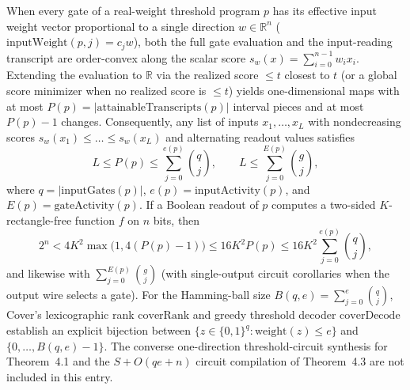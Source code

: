 \begin{result}
When every gate of a real-weight threshold program $p$ has its effective input
weight vector proportional to a single direction $w\in\mathbb R^n$
($\mathrm{inputWeight}(p,j)=c_j w$), both the full gate evaluation and the
input-reading transcript are order-convex along the scalar score
$s_w(x)=\sum_{i=0}^{n-1}w_i x_i$. Extending the evaluation to $\mathbb R$ via
the realized score $\le t$ closest to $t$ (or a global score minimizer when no
realized score is $\le t$) yields one-dimensional maps with at most
$P(p)=|\mathrm{attainableTranscripts}(p)|$ interval pieces and at most $P(p)-1$
changes. Consequently, any list of inputs $x_1,\dots,x_L$ with nondecreasing
scores $s_w(x_1)\le\dots\le s_w(x_L)$ and alternating readout values satisfies
\[
L \le P(p) \le \sum_{j=0}^{e(p)}\binom{q}{j},\qquad
L \le \sum_{j=0}^{E(p)}\binom{g}{j},
\]
where $q=|\mathrm{inputGates}(p)|$, $e(p)=\mathrm{inputActivity}(p)$, and
$E(p)=\mathrm{gateActivity}(p)$. If a Boolean readout of $p$ computes a
two-sided $K$-rectangle-free function $f$ on $n$ bits, then
\[
2^n < 4K^2\max\!\big(1,4(P(p)-1)\big) \le 16K^2 P(p)
\le 16K^2\sum_{j=0}^{e(p)}\binom{q}{j},
\]
and likewise with $\sum_{j=0}^{E(p)}\binom{g}{j}$ (with single-output circuit
corollaries when the output wire selects a gate). For the Hamming-ball size
$B(q,e)=\sum_{j=0}^e\binom qj$, Cover's lexicographic rank $\mathrm{coverRank}$
and greedy threshold decoder $\mathrm{coverDecode}$ establish an explicit
bijection between $\{z\in\{0,1\}^q:\mathrm{weight}(z)\le e\}$ and
$\{0,\dots,B(q,e)-1\}$. The converse one-direction threshold-circuit synthesis
for Theorem~4.1 and the $S+O(qe+n)$ circuit compilation of Theorem~4.3 are not
included in this entry.\citep{ThresholdCircuitRepresentations2026}

\end{result}
